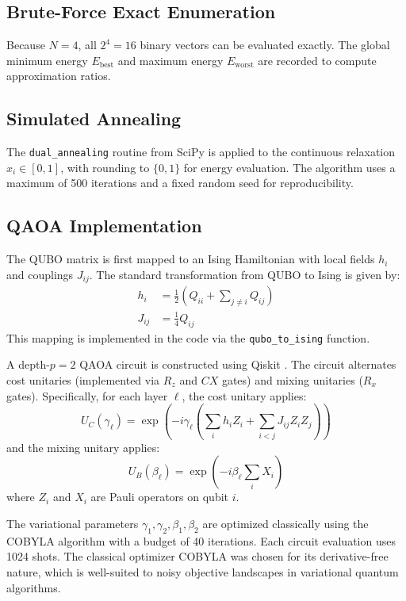 \documentclass[12pt]{article}
\begin{document}
\subsection{Brute-Force Exact Enumeration}
Because \(N = 4\), all \(2^{4} = 16\) binary vectors can be evaluated exactly. The global minimum energy \(E_{\text{best}}\) and maximum energy \(E_{\text{worst}}\) are recorded to compute approximation ratios.

\subsection{Simulated Annealing}
The \texttt{dual\_annealing} routine from SciPy \cite{virtanen2020scipy} is applied to the continuous relaxation \(x_i \in [0,1]\), with rounding to \(\{0,1\}\) for energy evaluation. The algorithm uses a maximum of 500 iterations and a fixed random seed for reproducibility.

\subsection{QAOA Implementation}
The QUBO matrix is first mapped to an Ising Hamiltonian with local fields \(h_i\) and couplings \(J_{ij}\). The standard transformation from QUBO to Ising is given by:
\begin{align}
h_i &= \frac{1}{2}\left( Q_{ii} + \sum_{j \neq i} Q_{ij} \right) \label{eq:ising_h} \\
J_{ij} &= \frac{1}{4} Q_{ij} \label{eq:ising_J}
\end{align}
This mapping is implemented in the code via the \texttt{qubo\_to\_ising} function.

A depth-\(p = 2\) QAOA circuit is constructed using Qiskit \cite{qiskit2024}. The circuit alternates cost unitaries (implemented via \(R_z\) and \(CX\) gates) and mixing unitaries (\(R_x\) gates). Specifically, for each layer \(\ell\), the cost unitary applies:
\begin{equation}
U_C(\gamma_\ell) = \exp\left(-i\gamma_\ell \left( \sum_i h_i Z_i + \sum_{i<j} J_{ij} Z_i Z_j \right) \right)
\end{equation}
and the mixing unitary applies:
\begin{equation}
U_B(\beta_\ell) = \exp\left(-i\beta_\ell \sum_i X_i \right)
\end{equation}
where \(Z_i\) and \(X_i\) are Pauli operators on qubit \(i\).

The variational parameters \(\gamma_1,\gamma_2,\beta_1,\beta_2\) are optimized classically using the COBYLA algorithm \cite{powell1994direct} with a budget of 40 iterations. Each circuit evaluation uses 1024 shots. The classical optimizer COBYLA was chosen for its derivative-free nature, which is well-suited to noisy objective landscapes in variational quantum algorithms.
\end{document}
